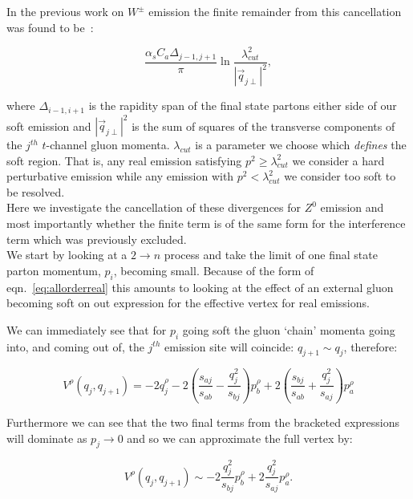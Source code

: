 		In the previous work on $W^\pm$ emission the finite remainder from this cancellation was found
		to be~\cite{Andersen:2009nu, Andersen:2008gc}:

		\begin{equation}
			\frac{\alpha_s C_a \Delta_{j-1, j+1}}{\pi}\ln{\frac{\lambda_{cut}^2}{|\vec{q}_{j\perp}|^2}},
		\end{equation}

		where $\Delta_{i-1, i+1}$ is the rapidity span of the final state partons either side of our
		soft emission and $|\vec{q}_{j\perp}|^2$ is the sum of squares of the transverse components of
		the $j^{th}$ $t$-channel gluon momenta.  $\lambda_{cut}$ is a parameter we choose which \emph{defines}
		the soft region.  That is, any real emission satisfying $p^2 \geq \lambda_{cut}^2$ we consider a hard perturbative
		emission while any emission with $p^2 < \lambda_{cut}^2$ we consider too soft to be resolved.\\
		Here we investigate
		the cancellation of these divergences for $Z^0$ emission and most importantly whether the finite term
		is of the same form for the interference term which was previously excluded.\\We start by looking
		at a $2\rightarrow n$ process and take the limit of one final state parton momentum, $p_i$, becoming
		small.  Because of the form of eqn.~\eqref{eq:allorderreal} this amounts to looking at the
		effect of an external gluon becoming soft on out expression for the effective vertex for real emissions.

		We can immediately see that for $p_i$ going soft the gluon `chain' momenta going into,
		and coming out of, the $j^{th}$ emission site will coincide: $q_{j+1}\sim q_j$, therefore:

		\begin{equation}
			V^\rho(q_j, q_{j+1}) = -2q_j^\rho - 2\left(\frac{s_{aj}}{s_{ab}} -
				\frac{q^2_{j}}{s_{bj}}\right)p_b^\rho + 2\left(\frac{s_{bj}}{s_{ab}} +
				\frac{q_j^2}{s_{aj}}\right)p_a^\rho
				\label{eqn:vertexlimit}
		\end{equation}

		Furthermore we can see that the two final terms from the bracketed expressions will dominate
		as $p_j\to0$ and so we can approximate the full vertex by:

		\begin{equation}
			V^\rho(q_j, q_{j+1}) \sim -2\frac{q^2_{j}}{s_{bj}}p_b^\rho + 2\frac{q_j^2}{s_{aj}}p_a^\rho.
				\label{eqn:vertexlimit2}
		\end{equation}

